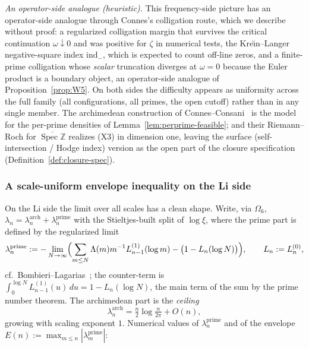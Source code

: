 \documentclass[11pt]{amsart}
\theoremstyle{definition}
\theoremstyle{remark}
\theoremstyle{definition}
\newcommand{\Z}{\mathbb{Z}}
\begin{document}
\emph{An operator-side analogue (heuristic).}  This frequency-side picture has an operator-side
analogue through Connes's colligation route, which we describe without proof: a regularized
colligation margin that survives the critical continuation $\omega\downarrow0$
and was positive for $\zeta$ in numerical tests, the Kre\u\i n--Langer negative-square index
$\mathrm{ind}_-$, which is expected to count off-line zeros, and a finite-prime colligation whose
\emph{scalar} truncation diverges at $\omega=0$ because the Euler product is a boundary object, an
operator-side analogue of Proposition~\ref{prop:W5}.  On both sides the difficulty appears as uniformity across the full family
(all configurations, all primes, the open cutoff) rather than in any single member.  The
archimedean construction of Connes--Consani~\cite{connesconsani2021} is the model for the per-prime
densities of Lemma~\ref{lem:perprime-feasible}; and their Riemann--Roch for $\overline{\operatorname{Spec}\Z}$
\cite{ConnesConsani2023} realizes (X3) in dimension one, leaving the surface (self-intersection / Hodge
index) version as the open part of the closure specification (Definition~\ref{def:closure-spec}).


\subsubsection*{A scale-uniform envelope inequality on the Li side}

On the Li side the limit over all scales has a clean shape.  Write,
via $\Omega_6$, $\lambda_n=\lambda_n^{\mathrm{arch}}+\lambda_n^{\mathrm{prime}}$ with the
Stieltjes-built split of $\log\xi$, where the prime part is defined by the regularized limit
\[
   \lambda_n^{\mathrm{prime}}:=-\lim_{N\to\infty}\Bigl(\sum_{m\le N}\Lambda(m)m^{-1}L^{(1)}_{n-1}(\log m)
   -\bigl(1-L_n(\log N)\bigr)\Bigr),\qquad L_n:=L_n^{(0)},
\]
cf.\ Bombieri--Lagarias~\cite{BombieriLagarias1999}; the counter-term is
$\int_0^{\log N}L^{(1)}_{n-1}(u)\,du=1-L_n(\log N)$, the main term of the sum by the prime number theorem.  The archimedean part is the \emph{ceiling}
\[
   \lambda_n^{\mathrm{arch}}=\tfrac{n}{2}\log\tfrac{n}{2\pi}+O(n),
\]
growing with scaling exponent $1$.  Numerical values of $\lambda_n^{\mathrm{prime}}$ and of the
envelope $E(n):=\max_{m\le n}|\lambda_m^{\mathrm{prime}}|$:
\end{document}
